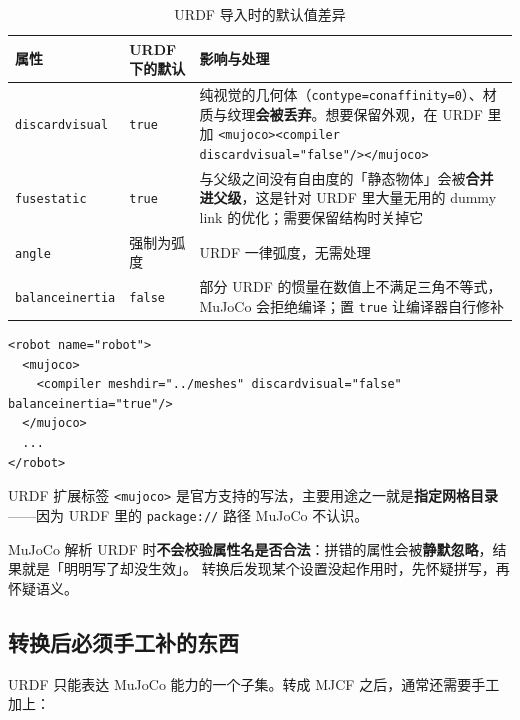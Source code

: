 \begin{table}[H]
	\centering
	\caption{URDF 导入时的默认值差异}
	\label{tab:Mjcf:URDF默认}
	\footnotesize
	\begin{tabular}{>{\raggedright\arraybackslash}p{3.4cm}>{\raggedright\arraybackslash}p{2.6cm}>{\raggedright\arraybackslash}p{8.2cm}}
		\hline
		属性 & URDF 下的默认 & 影响与处理 \\
		\hline
		\texttt{discardvisual} & \texttt{true} & 纯视觉的几何体（\texttt{contype=conaffinity=0}）、材质与纹理\textbf{会被丢弃}。想要保留外观，在 URDF 里加 \texttt{<mujoco><compiler discardvisual="false"/></mujoco>} \\
		\texttt{fusestatic} & \texttt{true} & 与父级之间没有自由度的「静态物体」会被\textbf{合并进父级}，这是针对 URDF 里大量无用的 dummy link 的优化；需要保留结构时关掉它 \\
		\texttt{angle} & 强制为弧度 & URDF 一律弧度，无需处理 \\
		\texttt{balanceinertia} & \texttt{false} & 部分 URDF 的惯量在数值上不满足三角不等式，MuJoCo 会拒绝编译；置 \texttt{true} 让编译器自行修补 \\
		\hline
	\end{tabular}
\end{table}

\begin{lstlisting}[style=xml]
<robot name="robot">
  <mujoco>
    <compiler meshdir="../meshes" discardvisual="false" balanceinertia="true"/>
  </mujoco>
  ...
</robot>
\end{lstlisting}

\begin{note}
	URDF 扩展标签 \texttt{<mujoco>} 是官方支持的写法，主要用途之一就是\textbf{指定网格目录}——因为 URDF 里的 \texttt{package://} 路径 MuJoCo 不认识。
\end{note}

\begin{warnbox}
	MuJoCo 解析 URDF 时\textbf{不会校验属性名是否合法}：拼错的属性会被\textbf{静默忽略}，结果就是「明明写了却没生效」。
	转换后发现某个设置没起作用时，先怀疑拼写，再怀疑语义。
\end{warnbox}

\subsection{转换后必须手工补的东西}

URDF 只能表达 MuJoCo 能力的一个子集。转成 MJCF 之后，通常还需要手工加上：

